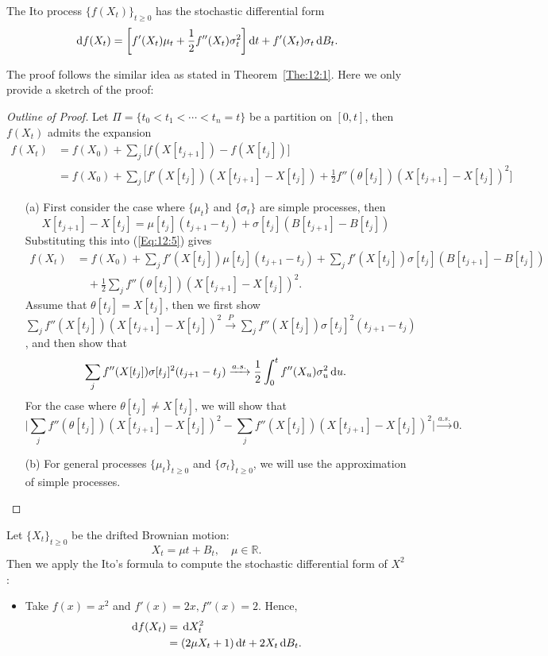 \begin{remark}
The Ito process $\{f(X_t)\}_{t\ge0}$ has the stochastic differential form
\[
\,\mathrm{d} f(X_t)=\bigg[
f'(X_t)\mu_t+\frac{1}{2}f''(X_t)\sigma_t^2
\bigg]\,\mathrm{d} t + f'(X_t)\sigma_t\,\mathrm{d} B_t.
\]
\end{remark}

The proof follows the similar idea as stated in Theorem~\ref{The:12:1}. Here we only provide a sketrch of the proof:
\begin{proof}[Outline of Proof]
Let $\Pi=\{t_0<t_1<\cdots<t_n=t\}$ be a partition on $[0,t]$, then $f(X_t)$ admits the expansion
\begin{equation}\label{Eq:12:5}
\begin{aligned}
f(X_t)&=f(X_0) + \sum_j\bigg[
f(X[t_{j+1}]) - f(X[t_j])
\bigg]\\
&=f(X_0) + \sum_j\bigg[
f'(X[t_j])(X[t_{j+1}] - X[t_j]) + \frac{1}{2}f''(\theta[t_j])(X[t_{j+1}] - X[t_j])^2
\bigg]
\end{aligned}
\end{equation}
\begin{enumerate}
\item[(a)]
First consider the case where $\{\mu_t\}$ and $\{\sigma_t\}$ are simple processes, then
\[
X[t_{j+1}] - X[t_j] = \mu[t_j](t_{j+1} - t_{j}) + \sigma[t_j](B[t_{j+1}] - B[t_{j}]) 
\]
Substituting this into (\eqref{Eq:12:5}) gives
\begin{align*}
f(X_t)&=f(X_0) + \sum_jf'(X[t_j])\mu[t_j](t_{j+1} - t_{j}) + \sum_jf'(X[t_j])\sigma[t_j](B[t_{j+1}] - B[t_{j}])\\
&\quad + \frac{1}{2}\sum_jf''(\theta[t_j])(X[t_{j+1}] - X[t_j])^2.
\end{align*}
Assume that $\theta[t_j]=X[t_j]$, then we first show $\sum_jf''(X[t_j])(X[t_{j+1}] - X[t_j])^2\xrightarrow{P}\sum_jf''(X[t_j])\sigma[t_j]^2(t_{j+1}-t_j)$, and then show that 
\[
\sum_jf''(X[t_j])\sigma[t_j]^2(t_{j+1}-t_j)\xrightarrow{a.s.}\frac{1}{2}\int_0^tf''(X_u)\sigma_u^2\,\mathrm{d} u.
\]
For the case where $\theta[t_j]\ne X[t_j]$, we will show that
\[
\bigg|
\sum_jf''(\theta[t_j])(X[t_{j+1}] - X[t_j])^2
-
\sum_jf''(X[t_j])(X[t_{j+1}] - X[t_j])^2
\bigg|\xrightarrow{a.s.}0.
\]
\item[(b)]
For general processes $\{\mu_t\}_{t\ge0}$ and $\{\sigma_t\}_{t\ge0}$, we will use the approximation of simple processes.
\end{enumerate}
\end{proof}

\begin{example}
Let $\{X_t\}_{t\ge0}$ be the drifted Brownian motion:
\[
X_t=\mu t + B_t,\quad \mu\in\mathbb{R}.
\]
Then we apply the Ito's formula to compute the stochastic differential form of $X^2$:
\begin{itemize}
\item
Take $f(x)=x^2$ and $f'(x)=2x, f''(x)=2$. Hence,
\begin{align*}
\,\mathrm{d} f(X_t)&=\,\mathrm{d} X_t^2\\
&=(2\mu X_t + 1)\,\mathrm{d} t + 2X_t\,\mathrm{d} B_t.
\end{align*}
\end{itemize}
\end{example}

